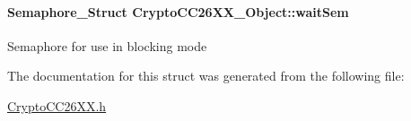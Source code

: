 \paragraph[{wait\+Sem}]{\setlength{\rightskip}{0pt plus 5cm}Semaphore\+\_\+\+Struct Crypto\+C\+C26\+X\+X\+\_\+\+Object\+::wait\+Sem}\label{struct_crypto_c_c26_x_x___object_a5845db71c0440f667b9ab19e22ee8fd5}
Semaphore for use in blocking mode 

The documentation for this struct was generated from the following file\+:\begin{DoxyCompactItemize}
\item 
\hyperlink{_crypto_c_c26_x_x_8h}{Crypto\+C\+C26\+X\+X.\+h}\end{DoxyCompactItemize}
